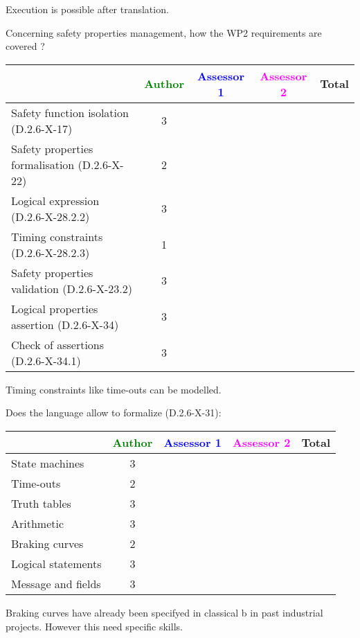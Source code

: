 \begin{author_comment}
Execution is possible after translation.
\end{author_comment}


Concerning safety properties management, how the WP2 requirements are covered ?

\begin{tabular}{|l | c | c | c | c|}
\hline
& \textcolor{green}{Author} & \textcolor{blue}{Assessor 1} & \textcolor{magenta}{Assessor 2} & Total \\
\hline 
Safety function isolation (D.2.6-X-17)  & 3 & & &  \\
\hline 
Safety properties formalisation (D.2.6-X-22)  & 2 & & &  \\
\hline
Logical expression (D.2.6-X-28.2.2)  & 3 & & &  \\
\hline
Timing constraints (D.2.6-X-28.2.3)  & 1 & & &  \\
\hline
Safety properties validation (D.2.6-X-23.2)  & 3 & & &  \\
\hline
Logical properties assertion (D.2.6-X-34)  &  3 & & &  \\
\hline
Check  of assertions (D.2.6-X-34.1)  & 3 & & &  \\
\hline
\end{tabular}


\begin{author_comment}
Timing constraints like time-outs can be modelled.
\end{author_comment}


Does the language allow to  formalize (D.2.6-X-31):

\begin{tabular}{|l | c | c | c | c|}
\hline
& \textcolor{green}{Author} & \textcolor{blue}{Assessor 1} & \textcolor{magenta}{Assessor 2} & Total \\
\hline 
State machines  & 3 & & &  \\
\hline
Time-outs  & 2 & & &  \\
\hline
Truth tables  & 3 & & &  \\
\hline
Arithmetic  & 3 & & &  \\
\hline
Braking curves  & 2 & & &  \\
\hline
Logical statements & 3 & & &  \\
\hline
Message and fields & 3 & & &  \\
\hline
\end{tabular}


\begin{author_comment}
Braking curves have already been specifyed in classical b  in past industrial projects. However this need specific skills.
\end{author_comment}



